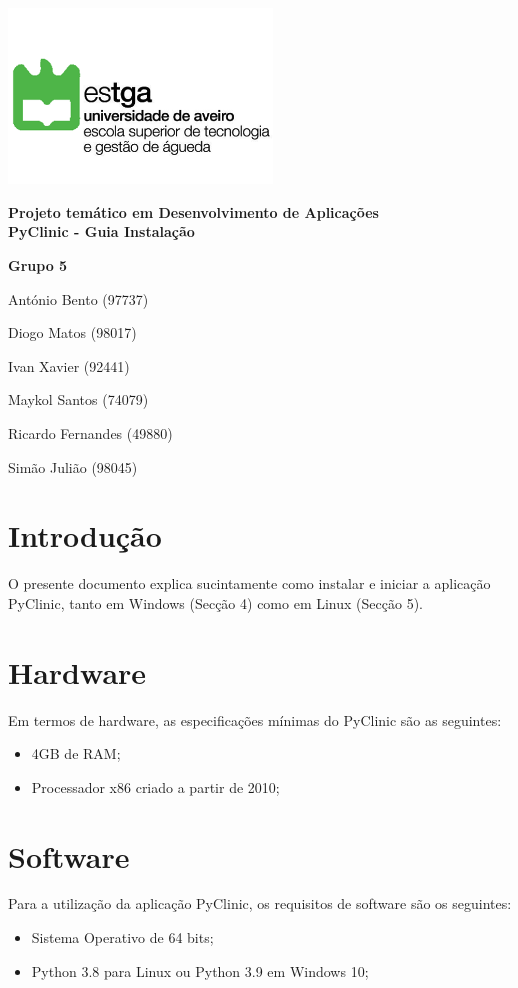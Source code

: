\documentclass[11pt,a4paper,twoside]{article}
\title{}
\author{}
\begin{document}
\begin{titlepage}
	\centering
	\vfill
	\includegraphics[width=7cm]{image/ESTGA} %
	\vfill
	
	{\bfseries\Large
		Projeto temático em Desenvolvimento de Aplicações\\
		PyClinic - Guia Instalação \\
		\vskip2cm
	}    
	
	\vfill
	\textbf{Grupo 5}
	
	António Bento (97737)
	
	Diogo Matos (98017)
	
	Ivan Xavier (92441)
	
	Maykol Santos (74079)
	
	Ricardo Fernandes (49880)
	
	Simão Julião (98045)
	\vfill
\end{titlepage}


\section{Introdução}
O presente documento explica sucintamente como instalar e iniciar a aplicação PyClinic, tanto em Windows (Secção 4) como em Linux (Secção 5).
\section{Hardware}
Em termos de hardware, as especificações mínimas do PyClinic são as seguintes:
\begin{itemize}
\item 4GB de RAM;
\item Processador x86 criado a partir de 2010;
\end{itemize}

\section{Software}
Para a utilização da aplicação PyClinic, os requisitos de software são os seguintes:
\begin{itemize}
	\item Sistema Operativo de 64 bits;
	\item Python 3.8 para Linux ou Python 3.9 em Windows 10;
\end{itemize}
\end{document}

